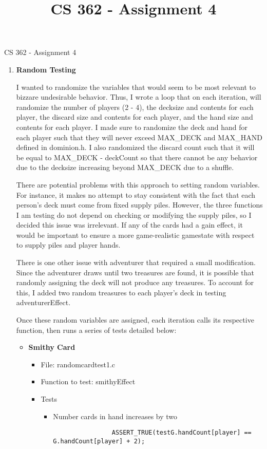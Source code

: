\documentclass[11pt,letterpaper]{article}
\begin{document}
 \univlogo

\title{CS 362 - Assignment 4}
{\Huge CS 362 - Assignment 4}\\[5mm]
\begin{enumerate}[label=\arabic*., leftmargin=*]
  \item \textbf{Random Testing}

    I wanted to randomize the variables that would seem to be most relevant to 
    bizzare undesirable behavior. Thus, I wrote a loop that on each iteration,
    will randomize the number of players (2 - 4), the decksize and contents for
    each player, the discard size and contents for each player, and the hand size
    and contents for each player. I made sure to randomize the deck and hand for
    each player such that they will never exceed MAX\_DECK and MAX\_HAND 
    defined in dominion.h. I also randomized the discard count such that it will
    be equal to MAX\_DECK - deckCount so that there cannot be any behavior due to
    the decksize increasing beyond MAX\_DECK due to a shuffle. 

    There are potential problems with this approach to setting random variables.
    For instance, it makes no attempt to stay consistent with the fact that
    each person's deck must come from fixed supply piles. However, the
    three functions I am testing do not depend on checking or modifying
    the supply piles, so I decided this issue was irrelevant. If any of the
    cards had a gain effect, it would be important to ensure a more game-realistic
    gamestate with respect to supply piles and player hands. 

    There is one other issue with adventurer that required a small modification. 
    Since the adventurer draws until two treasures are found, it is possible
    that randomly assigning the deck will not produce any treasures. To
    account for this, I added two random treasures to each player's deck in
    testing adventurerEffect.

    Once these random variables are assigned, each iteration calls its respective
    function, then runs a series of tests detailed below: 

    \begin{itemize}[leftmargin=*]

      \item \textbf{Smithy Card}
        \begin{itemize}[leftmargin=*]
          \item File: randomcardtest1.c
          \item Function to test: smithyEffect
          \item Tests
            \begin{itemize}[leftmargin=*]
              \item Number cards in hand increases by two
                \begin{lstlisting}
                ASSERT_TRUE(testG.handCount[player] == G.handCount[player] + 2);
                \end{lstlisting}


\end{itemize}
\end{itemize}
\end{itemize}
\end{enumerate}
\end{document}

